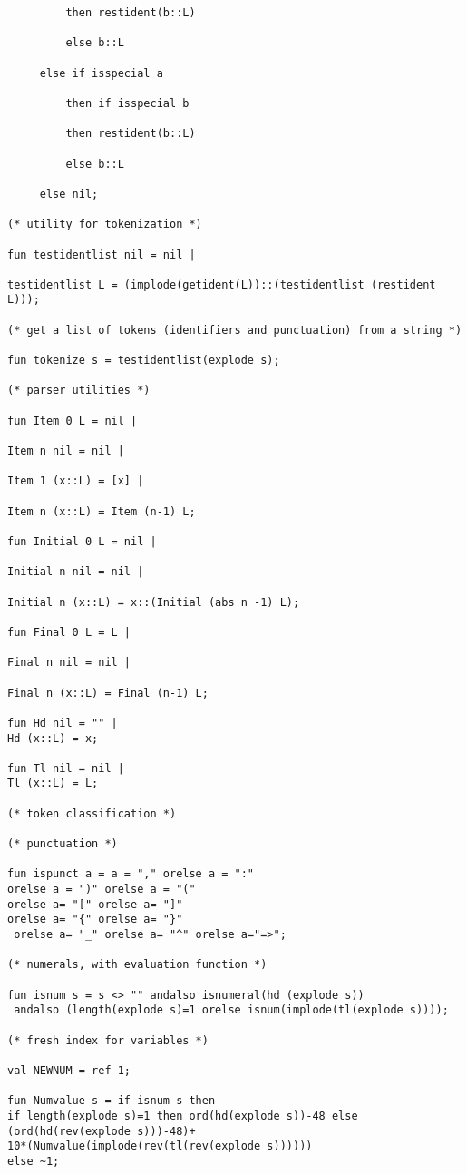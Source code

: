 \documentclass{article}
\begin{document}
{{\begin{verbatim}
         then restident(b::L)

         else b::L

     else if isspecial a

         then if isspecial b

         then restident(b::L)

         else b::L

     else nil;

(* utility for tokenization *)

fun testidentlist nil = nil |

testidentlist L = (implode(getident(L))::(testidentlist (restident L)));

(* get a list of tokens (identifiers and punctuation) from a string *)

fun tokenize s = testidentlist(explode s);

(* parser utilities *)

fun Item 0 L = nil |

Item n nil = nil |

Item 1 (x::L) = [x] |

Item n (x::L) = Item (n-1) L;

fun Initial 0 L = nil |

Initial n nil = nil |

Initial n (x::L) = x::(Initial (abs n -1) L);

fun Final 0 L = L |

Final n nil = nil |

Final n (x::L) = Final (n-1) L;

fun Hd nil = "" |
Hd (x::L) = x;

fun Tl nil = nil |
Tl (x::L) = L;

(* token classification *)

(* punctuation *)

fun ispunct a = a = "," orelse a = ":" 
orelse a = ")" orelse a = "(" 
orelse a= "[" orelse a= "]" 
orelse a= "{" orelse a= "}"
 orelse a= "_" orelse a= "^" orelse a="=>";

(* numerals, with evaluation function *)

fun isnum s = s <> "" andalso isnumeral(hd (explode s))
 andalso (length(explode s)=1 orelse isnum(implode(tl(explode s))));

(* fresh index for variables *)

val NEWNUM = ref 1;

fun Numvalue s = if isnum s then
if length(explode s)=1 then ord(hd(explode s))-48 else
(ord(hd(rev(explode s)))-48)+
10*(Numvalue(implode(rev(tl(rev(explode s))))))
else ~1;


\end{verbatim}}}
\end{document}
